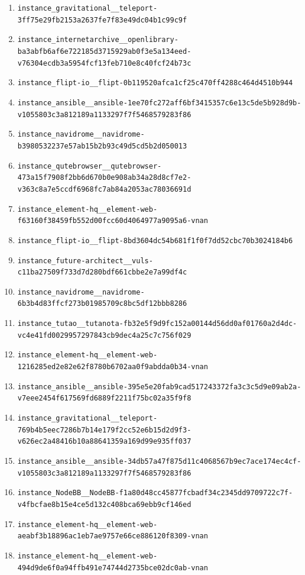 \documentclass{llmxive}
\begin{document}
\begin{enumerate}
\item \texttt{instance\_gravitational\_\_teleport-3ff75e29fb2153a2637fe7f83e49dc04b1c99c9f}
\item \texttt{instance\_internetarchive\_\_openlibrary-ba3abfb6af6e722185d3715929ab0f3e5a134eed-v76304ecdb3a5954fcf13feb710e8c40fcf24b73c}
\item \texttt{instance\_flipt-io\_\_flipt-0b119520afca1cf25c470ff4288c464d4510b944}
\item \texttt{instance\_ansible\_\_ansible-1ee70fc272aff6bf3415357c6e13c5de5b928d9b-v1055803c3a812189a1133297f7f5468579283f86}
\item \texttt{instance\_navidrome\_\_navidrome-b3980532237e57ab15b2b93c49d5cd5b2d050013}
\item \texttt{instance\_qutebrowser\_\_qutebrowser-473a15f7908f2bb6d670b0e908ab34a28d8cf7e2-v363c8a7e5ccdf6968fc7ab84a2053ac78036691d}
\item \texttt{instance\_element-hq\_\_element-web-f63160f38459fb552d00fcc60d4064977a9095a6-vnan}
\item \texttt{instance\_flipt-io\_\_flipt-8bd3604dc54b681f1f0f7dd52cbc70b3024184b6}
\item \texttt{instance\_future-architect\_\_vuls-c11ba27509f733d7d280bdf661cbbe2e7a99df4c}
\item \texttt{instance\_navidrome\_\_navidrome-6b3b4d83ffcf273b01985709c8bc5df12bbb8286}
\item \texttt{instance\_tutao\_\_tutanota-fb32e5f9d9fc152a00144d56dd0af01760a2d4dc-vc4e41fd0029957297843cb9dec4a25c7c756f029}
\item \texttt{instance\_element-hq\_\_element-web-1216285ed2e82e62f8780b6702aa0f9abdda0b34-vnan}
\item \texttt{instance\_ansible\_\_ansible-395e5e20fab9cad517243372fa3c3c5d9e09ab2a-v7eee2454f617569fd6889f2211f75bc02a35f9f8}
\item \texttt{instance\_gravitational\_\_teleport-769b4b5eec7286b7b14e179f2cc52e6b15d2d9f3-v626ec2a48416b10a88641359a169d99e935ff037}
\item \texttt{instance\_ansible\_\_ansible-34db57a47f875d11c4068567b9ec7ace174ec4cf-v1055803c3a812189a1133297f7f5468579283f86}
\item \texttt{instance\_NodeBB\_\_NodeBB-f1a80d48cc45877fcbadf34c2345dd9709722c7f-v4fbcfae8b15e4ce5d132c408bca69ebb9cf146ed}
\item \texttt{instance\_element-hq\_\_element-web-aeabf3b18896ac1eb7ae9757e66ce886120f8309-vnan}
\item \texttt{instance\_element-hq\_\_element-web-494d9de6f0a94ffb491e74744d2735bce02dc0ab-vnan}

\end{enumerate}
\end{document}
